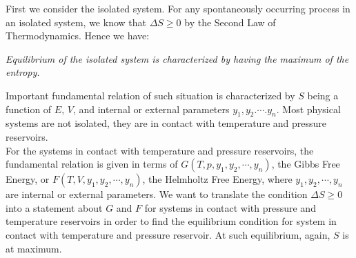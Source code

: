 \documentclass[11pt,oneside]{book}
\theoremstyle{break}
\theoremstyle{break}
\begin{document}
First we consider the isolated system. For any spontaneously occurring process in an isolated system, we know that $\Delta S \geq 0$ by the Second Law of Thermodynamics. Hence we have:
\begin{center}
\textit{Equilibrium of the isolated system is characterized by having the maximum of the entropy.}
\end{center} 
Important fundamental relation of such situation is characterized by $S$ being a function of $E$, $V$, and internal or external parameters $y_1,y_2.\cdots. y_n$. Most physical systems are not isolated, they are in contact with temperature and pressure reservoirs.\\

For the systems in contact with temperature and pressure reservoirs, the fundamental relation is given in terms of $G(T,p, y_1,y_2,\cdots,y_n)$, the Gibbs Free Energy, or $F(T,V,y_1,y_2,\cdots, y_n)$, the Helmholtz Free Energy, where $y_1,y_2,\cdots, y_n$ are internal or external parameters. We want to translate the condition $\Delta S \geq 0$ into a statement about $G$ and $F$ for systems in contact with pressure and temperature reservoirs in order to find the equilibrium condition for system in contact with temperature and pressure reservoir. At such equilibrium, again, $S$ is at maximum.\\
\end{document}
